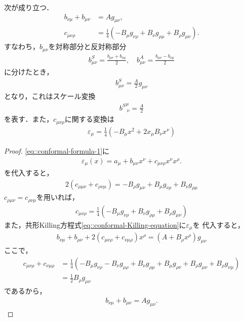 \begin{prop}
	次が成り立つ．
	\begin{align}
		b_{\nu\mu}+b_{\mu\nu} & =Ag_{\mu\nu},                                                                       \\
		c_{\mu\nu\rho}        & =\frac{1}{4}\left(-B_{\mu}g_{\nu\rho}+B_{\nu}g_{\rho\mu}+B_{\rho}g_{\mu\nu}\right).
	\end{align}
	すなわち，\(b_{\mu\nu}\)を対称部分と反対称部分
	\begin{align}
		b^{S}_{\mu\nu}=\frac{b_{\mu\nu}+b_{\nu\mu}}{2},\quad{}b^{A}_{\mu\nu}=\frac{b_{\mu\nu}-b_{\nu\mu}}{2}
	\end{align}
	に分けたとき，
	\begin{align}
		b^{S}_{\mu\nu}=\frac{A}{2}g_{\mu\nu}
	\end{align}
	となり，これはスケール変換
	\begin{align}
		{b^{S}}^{\mu}_{\ \nu}=\frac{A}{2}
	\end{align}
	を表す．また，\(c_{\mu\nu\rho}\)に関する変換は
	\begin{align}
		\varepsilon_{\mu}=\frac{1}{4}\left(-B_{\mu}x^{2}+2x_{\mu}B_{\nu}x^{\nu}\right)
	\end{align}
\end{prop}
\begin{proof}
	\cref{eq::conformal-formula-1}に
	\begin{align}
		\varepsilon_{\mu}(x)=a_{\mu}+b_{\mu\nu}x^{\nu}+c_{\mu\nu\rho}x^{\nu}x^{\rho}.
	\end{align}
	を代入すると，
	\begin{align}
		2(c_{\rho\mu\nu}+c_{\rho\nu\mu})=-B_{\rho}g_{\mu\nu}+B_{\mu}g_{\nu\rho}+B_{\nu}g_{\rho\mu}
	\end{align}
	\(c_{\rho\mu\nu}=c_{\rho\nu\mu}\)を用いれば，
	\begin{align}
		c_{\mu\nu\rho}=\frac{1}{4}\left(-B_{\mu}g_{\nu\rho}+B_{\nu}g_{\rho\mu}+B_{\rho}g_{\mu\nu}\right)
	\end{align}
	また，共形Killing方程式\cref{eq::conformal-Killing-equation}に\(\varepsilon_{\mu}\)を
	代入すると，
	\begin{align}
		b_{\nu\mu}+b_{\mu\nu}+2(c_{\mu\nu\rho}+c_{\nu\mu\rho})x^{\rho}=(A+B_{\rho}x^{\rho})g_{\mu\nu}
	\end{align}
	ここで，
	\begin{align}
		c_{\mu\nu\rho}+c_{\nu\mu\rho} & =\frac{1}{4}\left(-B_{\mu}g_{\nu\rho}-B_{\nu}g_{\mu\rho}+B_{\nu}g_{\rho\mu}+B_{\mu}g_{\rho\nu}+B_{\rho}g_{\mu\nu}+B_{\rho}g_{\nu\mu}\right) \\
		                              & =\frac{1}{2}B_{\rho}g_{\mu\nu}
	\end{align}
	であるから，
	\begin{align}
		b_{\nu\mu}+b_{\mu\nu}=Ag_{\mu\nu}.
	\end{align}
\end{proof}
